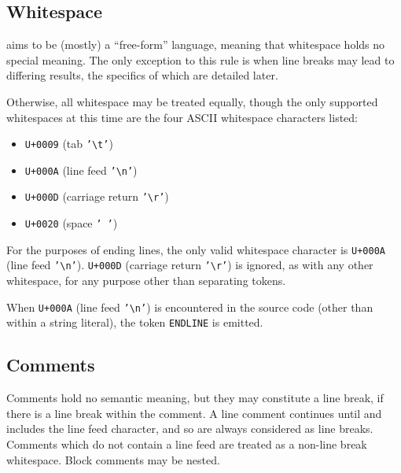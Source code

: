 \subsection{Whitespace}

\Trilogy{} aims to be (mostly) a ``free-form'' language, meaning that
whitespace holds no special meaning. The only exception to this rule
is when line breaks may lead to differing results, the specifics of which
are detailed later.

Otherwise, all whitespace may be treated equally, though the only supported
whitespaces at this time are the four ASCII whitespace characters listed:

\begin{itemize}
    \item \texttt{U+0009} (tab \texttt{'\textbackslash t'})
    \item \texttt{U+000A} (line feed \texttt{'\textbackslash n'})
    \item \texttt{U+000D} (carriage return \texttt{'\textbackslash r'})
    \item \texttt{U+0020} (space \texttt{' '})
\end{itemize}

For the purposes of ending lines, the only valid whitespace character is
\texttt{U+000A} (line feed \texttt{'\textbackslash n'}).
\texttt{U+000D} (carriage return \texttt{'\textbackslash r'}) is ignored,
as with any other whitespace, for any purpose other than separating tokens.

When \texttt{U+000A} (line feed \texttt{'\textbackslash n'}) is encountered
in the source code (other than within a string literal), the token
\texttt{ENDLINE} is emitted.

\subsection{Comments}

Comments hold no semantic meaning, but they may constitute a line break,
if there is a line break within the comment. A line comment continues until and
includes the line feed character, and so are always considered as line breaks.
Comments which do not contain a line feed are treated as a non-line
break whitespace. Block comments may be nested.

\begin{bnf*}
     \\
     \\
     \\
     \\
     \\
\end{bnf*}

